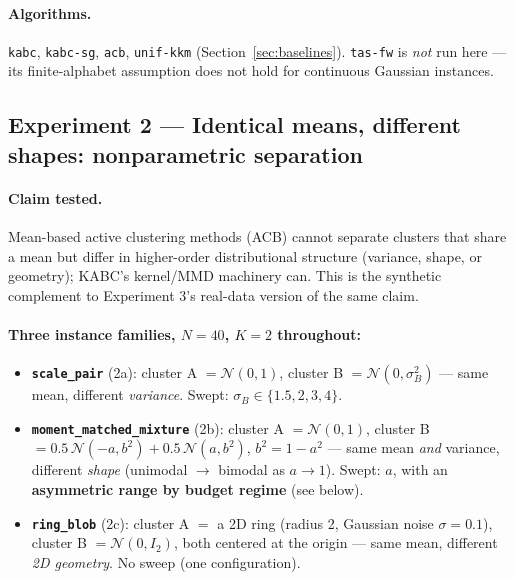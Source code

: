 \documentclass[11pt]{article}
\begin{document}
\paragraph{Algorithms.} \texttt{kabc}, \texttt{kabc-sg}, \texttt{acb}, \texttt{unif-kkm}
(Section~\ref{sec:baselines}). \texttt{tas-fw} is \emph{not} run here --- its
finite-alphabet assumption does not hold for continuous Gaussian instances.

\subsection{Experiment 2 --- Identical means, different shapes: nonparametric separation}
\label{sec:setup-exp2}

\paragraph{Claim tested.} Mean-based active clustering methods (ACB) cannot
separate clusters that share a mean but differ in higher-order distributional
structure (variance, shape, or geometry); KABC's kernel/MMD machinery can.
This is the synthetic complement to Experiment 3's real-data version of the
same claim.

\paragraph{Three instance families, $N=40$, $K=2$ throughout:}
\begin{itemize}
  \item \textbf{\texttt{scale\_pair}} (2a): cluster A $=\mathcal N(0,1)$, cluster B
    $=\mathcal N(0,\sigma_B^2)$ --- same mean, different \emph{variance}. Swept:
    $\sigma_B \in \{1.5, 2, 3, 4\}$.
  \item \textbf{\texttt{moment\_matched\_mixture}} (2b): cluster A $=\mathcal
    N(0,1)$, cluster B $= 0.5\,\mathcal N(-a,b^2) + 0.5\,\mathcal N(a,b^2)$,
    $b^2=1-a^2$ --- same mean \emph{and} variance, different \emph{shape}
    (unimodal $\to$ bimodal as $a\to1$). Swept: $a$, with an
    \textbf{asymmetric range by budget regime} (see below).
  \item \textbf{\texttt{ring\_blob}} (2c): cluster A $=$ a 2D ring (radius 2,
    Gaussian noise $\sigma=0.1$), cluster B $=\mathcal N(0,I_2)$, both centered
    at the origin --- same mean, different \emph{2D geometry}. No sweep (one
    configuration).
\end{itemize}
\end{document}
